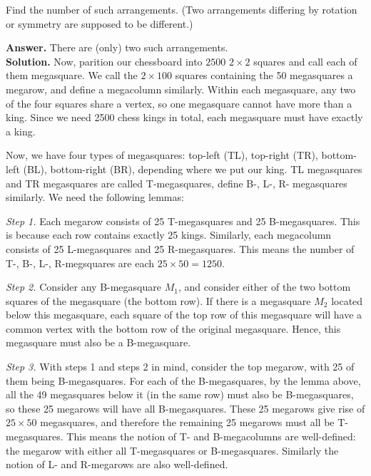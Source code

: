 \documentclass[12pt]{article}
\newcommand{\<}{\langle}
\renewcommand{\>}{\rangle}
\begin{document}
\begin{enumerate}
	Find the number of such arrangements. (Two arrangements differing by rotation or symmetry are supposed to be different.)
	
	\textbf{Answer.} There are (only) two such arrangements. \\
	\textbf{Solution.} Now, parition our chessboard into $2500$ $2\times 2$ squares and call each of them megasquare. We call the $2\times 100$ squares containing the 50 megasquares a megarow, and define a megacolumn similarly. Within each megasquare, any two of the four squares share a vertex, so one megasquare cannot have more than a king. Since we need 2500 chess kings in total, each megasquare must have exactly a king. 
	
	Now, we have four types of megasquares: top-left (TL), top-right (TR), bottom-left (BL), bottom-right (BR), depending where we put our king. TL megasquares and TR megasquares are called T-megasquares, define B-, L-, R- megasquares similarly. We need the following lemmas: 
	
	\emph{Step 1.} Each megarow consists of 25 T-megasquares and 25 B-megasquares. This is because each row contains exactly 25 kings. Similarly, each megacolumn consists of 25 L-megasquares and 25 R-megasquares. This means the number of T-, B-, L-, R-megsquares are each $25\times 50=1250$. 
	
	\emph{Step 2.} Consider any B-megasquare $M_1$, and consider either of the two bottom squares of the megasquare (the bottom row). If there is a megasquare $M_2$ located below this megasquare, each square of the top row of this megasquare will have a common vertex with the bottom row of the original megasquare. Hence, this megasquare must also be a B-megasquare. 
	
	\emph{Step 3.} With steps 1 and steps 2 in mind, consider the top megarow, with 25 of them being B-megasquares. For each of the B-megasquares, by the lemma above, all the 49 megasquares below it (in the same row) must also be B-megasquares, so these 25 megarows will have all B-megasquares. These 25 megarows give rise of $25\times 50$ megasquares, and therefore the remaining 25 megarows must all be T-megasquares. This means the notion of T- and B-megacolumns are well-defined: the megarow with either all T-megasquares or B-megasquares. Similarly the notion of L- and R-megarows are also well-defined. 
	

\end{enumerate}
\end{document}
